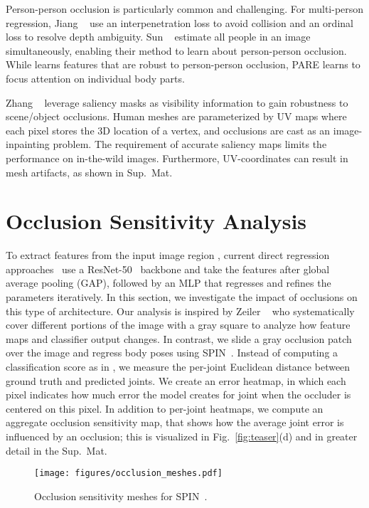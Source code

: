 \documentclass[10pt,twocolumn,letterpaper,usenames,dvipsnames]{article}
\newcommand{\methodname}{PARE\xspace}
\newcommand{\figref}[1]{Fig.~\ref{#1}}
\newcommand{\supmat}{Sup.~Mat.\xspace}
\begin{document}
Person-person occlusion is particularly common and challenging. 
For multi-person regression, Jiang \etal~\cite{jiang2020mpshape} use an interpenetration loss to avoid collision and an ordinal loss to resolve depth ambiguity. 
Sun \etal~\cite{CenterHMR} estimate all people in an image simultaneously, enabling their method to learn about person-person occlusion.
While \cite{CenterHMR} learns features that are robust to person-person occlusion, {\methodname} learns to focus attention on individual body parts.

Zhang \etal~\cite{zhangoohcvpr20} leverage saliency masks as visibility information to gain robustness to scene/object occlusions. 
Human meshes are parameterized by UV maps where each pixel stores the 3D location of a vertex, and occlusions are cast as an image-inpainting problem.
The requirement of accurate saliency maps limits the performance on in-the-wild images. Furthermore, UV-coordinates can result in mesh artifacts, as shown in \supmat
 	\section{Occlusion Sensitivity Analysis}
\label{sec:occlusion_analysis}
To extract features from the input image region , current direct regression approaches~\cite{kanazawa_hmr,SPIN:ICCV:2019} use a ResNet-50~\cite{he2016resnet} backbone and take the features after global average pooling (GAP), followed by an MLP that regresses and refines the parameters iteratively. 
In this section, we investigate the impact of occlusions on this type of architecture. Our analysis is inspired by  Zeiler \etal~\cite{zeiler2014visualizing} who systematically cover different portions of the image with a gray square to analyze how feature maps and classifier output changes. 
In contrast, we slide a gray occlusion patch over the image and regress body poses using SPIN~\cite{SPIN:ICCV:2019}.
Instead of computing a classification score as in \cite{zeiler2014visualizing}, we measure the per-joint Euclidean distance between ground truth and predicted joints. 
We create an error heatmap, in which each pixel indicates how much error the model creates for joint  when the occluder is centered on this pixel.
In addition to per-joint heatmaps, we compute an aggregate occlusion sensitivity map, that shows how the average joint error is influenced by an occlusion; this is visualized in \figref{fig:teaser}(d) and in greater detail in the \supmat

\begin{figure}
	\centering
	\texttt{[image: figures/occlusion\_meshes.pdf]}
	\caption{Occlusion sensitivity meshes for SPIN~\cite{SPIN:ICCV:2019}. }
	\label{fig:occ_meshes}
	\vspace{-2ex}
\end{figure}{}
\end{document}
